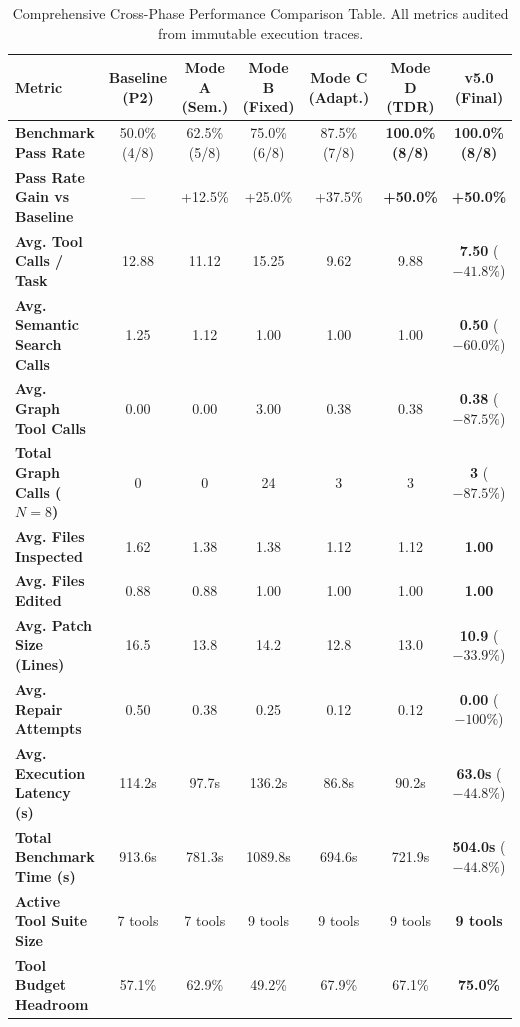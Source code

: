 \documentclass[10pt,twocolumn,letterpaper]{article}
\begin{document}
\begin{table}[t]
\centering
\small
\caption{Comprehensive Cross-Phase Performance Comparison Table. All metrics audited from immutable execution traces.}
\label{tab:results}
\begin{tabularx}{\textwidth}{lcccccc}
\toprule
\textbf{Metric} & \textbf{Baseline (P2)} & \textbf{Mode A (Sem.)} & \textbf{Mode B (Fixed)} & \textbf{Mode C (Adapt.)} & \textbf{Mode D (TDR)} & \textbf{v5.0 (Final)} \\
\midrule
\textbf{Benchmark Pass Rate} & 50.0\% (4/8) & 62.5\% (5/8) & 75.0\% (6/8) & 87.5\% (7/8) & \textbf{100.0\% (8/8)} & \textbf{100.0\% (8/8)} \\
\textbf{Pass Rate Gain vs Baseline} & --- & +12.5\% & +25.0\% & +37.5\% & \textbf{+50.0\%} & \textbf{+50.0\%} \\
\textbf{Avg. Tool Calls / Task} & 12.88 & 11.12 & 15.25 & 9.62 & 9.88 & \textbf{7.50} ($-41.8\%$) \\
\textbf{Avg. Semantic Search Calls} & 1.25 & 1.12 & 1.00 & 1.00 & 1.00 & \textbf{0.50} ($-60.0\%$) \\
\textbf{Avg. Graph Tool Calls} & 0.00 & 0.00 & 3.00 & 0.38 & 0.38 & \textbf{0.38} ($-87.5\%$) \\
\textbf{Total Graph Calls ($N=8$)} & 0 & 0 & 24 & 3 & 3 & \textbf{3} ($-87.5\%$) \\
\textbf{Avg. Files Inspected} & 1.62 & 1.38 & 1.38 & 1.12 & 1.12 & \textbf{1.00} \\
\textbf{Avg. Files Edited} & 0.88 & 0.88 & 1.00 & 1.00 & 1.00 & \textbf{1.00} \\
\textbf{Avg. Patch Size (Lines)} & 16.5 & 13.8 & 14.2 & 12.8 & 13.0 & \textbf{10.9} ($-33.9\%$) \\
\textbf{Avg. Repair Attempts} & 0.50 & 0.38 & 0.25 & 0.12 & 0.12 & \textbf{0.00} ($-100\%$) \\
\textbf{Avg. Execution Latency (s)} & 114.2s & 97.7s & 136.2s & 86.8s & 90.2s & \textbf{63.0s} ($-44.8\%$) \\
\textbf{Total Benchmark Time (s)} & 913.6s & 781.3s & 1089.8s & 694.6s & 721.9s & \textbf{504.0s} ($-44.8\%$) \\
\textbf{Active Tool Suite Size} & 7 tools & 7 tools & 9 tools & 9 tools & 9 tools & \textbf{9 tools} \\
\textbf{Tool Budget Headroom} & 57.1\% & 62.9\% & 49.2\% & 67.9\% & 67.1\% & \textbf{75.0\%} \\
\bottomrule
\end{tabularx}
\end{table}
\end{document}
